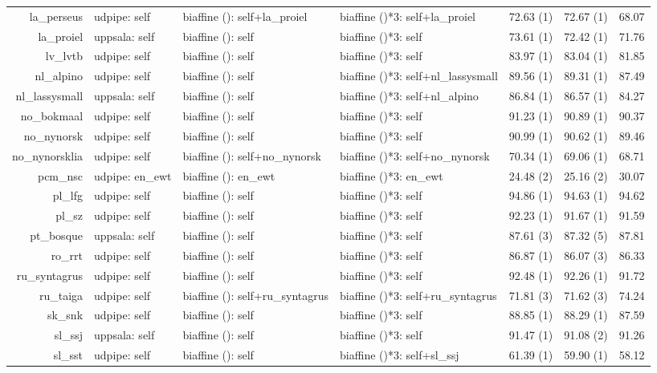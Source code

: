 \documentclass[11pt,a4paper]{article}
\begin{document}
\begin{table*}[t]
\begin{tabular}{rlllccc}
		la\_perseus & udpipe: self & biaffine (): self+la\_proiel & biaffine ()*3: self+la\_proiel & 72.63 (1) & 72.67 (1) & 68.07 \\
		la\_proiel & uppsala: self & biaffine (): self & biaffine ()*3: self & 73.61 (1) & 72.42 (1) & 71.76 \\
		lv\_lvtb & udpipe: self & biaffine (): self & biaffine ()*3: self & 83.97 (1) & 83.04 (1) & 81.85 \\
		nl\_alpino & udpipe: self & biaffine (): self & biaffine ()*3: self+nl\_lassysmall & 89.56 (1) & 89.31 (1) & 87.49 \\
		nl\_lassysmall & uppsala: self & biaffine (): self & biaffine ()*3: self+nl\_alpino & 86.84 (1) & 86.57 (1) & 84.27 \\
		no\_bokmaal & udpipe: self & biaffine (): self & biaffine ()*3: self & 91.23 (1) & 90.89 (1) & 90.37 \\
		no\_nynorsk & udpipe: self & biaffine (): self & biaffine ()*3: self & 90.99 (1) & 90.62 (1) & 89.46 \\
		no\_nynorsklia & udpipe: self & biaffine (): self+no\_nynorsk & biaffine ()*3: self+no\_nynorsk & 70.34 (1) & 69.06 (1) & 68.71 \\
		pcm\_nsc & udpipe: en\_ewt & biaffine (): en\_ewt & biaffine ()*3: en\_ewt & 24.48 (2) & 25.16 (2) & 30.07 \\
		pl\_lfg & udpipe: self & biaffine (): self & biaffine ()*3: self & 94.86 (1) & 94.63 (1) & 94.62 \\
		pl\_sz & udpipe: self & biaffine (): self & biaffine ()*3: self & 92.23 (1) & 91.67 (1) & 91.59  \\
		pt\_bosque & uppsala: self & biaffine (): self & biaffine ()*3: self & 87.61 (3) & 87.32 (5) & 87.81 \\
		ro\_rrt & udpipe: self & biaffine (): self & biaffine ()*3: self & 86.87 (1) & 86.07 (3) & 86.33 \\
		ru\_syntagrus & udpipe: self & biaffine (): self & biaffine ()*3: self & 92.48 (1) & 92.26 (1) & 91.72  \\
		ru\_taiga & udpipe: self & biaffine (): self+ru\_syntagrus & biaffine ()*3: self+ru\_syntagrus & 71.81 (3) & 71.62 (3) & 74.24  \\
		sk\_snk & udpipe: self & biaffine (): self & biaffine ()*3: self & 88.85 (1) & 88.29 (1) & 87.59 \\
		sl\_ssj & uppsala: self & biaffine (): self & biaffine ()*3: self & 91.47 (1) & 91.08 (2) & 91.26 \\
		sl\_sst & udpipe: self & biaffine (): self & biaffine ()*3: self+sl\_ssj & 61.39 (1) & 59.90 (1) & 58.12 \\

\end{tabular}
\end{table*}
\end{document}
